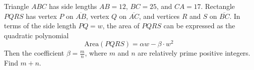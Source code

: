 Triangle $ABC$ has side lengths $AB=12$, $BC=25$, and $CA=17$. Rectangle $PQRS$ has vertex $P$ on $\overline{AB}$, vertex $Q$ on $\overline{AC}$, and vertices $R$ and $S$ on $\overline{BC}$. In terms of the side length $PQ=w$, the area of $PQRS$ can be expressed as the quadratic polynomial
\[\text{Area}(PQRS)=\alpha w-\beta\cdot w^2\]
Then the coefficient $\beta=\frac{m}{n}$, where $m$ and $n$ are relatively prime positive integers. Find $m+n$.